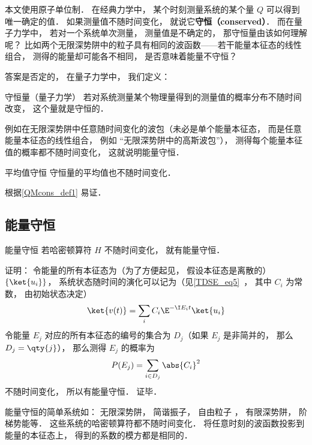 

本文使用原子单位制． 在经典力学中， 某个时刻测量系统的某个量 $Q$ 可以得到唯一确定的值． 如果测量值不随时间变化， 就说它\textbf{守恒（conserved）}． 而在量子力学中， 若对一个系统单次测量， 测量值是不确定的， 那守恒量由该如何理解呢？ 比如两个无限深势阱中的粒子具有相同的波函数——若干能量本征态的线性组合， 测得的能量却可能各不相同， 是否意味着能量不守恒？

答案是否定的， 在量子力学中， 我们定义：
\begin{definition}{守恒量（量子力学）}\label{QMcons_def1}
若对系统测量某个物理量得到的测量值的概率分布不随时间改变， 这个量就是守恒的．
\end{definition}

例如在无限深势阱中任意随时间变化的波包（未必是单个能量本征态， 而是任意能量本征态的线性组合， 例如 “无限深势阱中的高斯波包”）， 测得每个能量本征值的概率都不随时间变化， 这就说明能量守恒．

\begin{corollary}{平均值守恒}
守恒量的平均值也不随时间变化．
\end{corollary}
根据\autoref{QMcons_def1} 易证．

\subsection{能量守恒}

\begin{theorem}{能量守恒}
若哈密顿算符 $H$ 不随时间变化， 就有能量守恒．
\end{theorem}
证明： 令能量的所有本征态为（为了方便起见， 假设本征态是离散的） $\{\ket{u_i}\}$， 系统状态随时间的演化可以记为（见\autoref{TDSE_eq5}~， 其中 $C_i$ 为常数， 由初始状态决定）
\begin{equation}
\ket{v(t)} = \sum_i C_i \E^{-\I E_i t} \ket{u_i}
\end{equation}
令能量 $E_j$ 对应的所有本征态的编号的集合为 $D_j$（如果 $E_j$ 是非简并的， 那么 $D_j = \qty{j}$），%
那么测得 $E_j$ 的概率为
\begin{equation}
P(E_j) = \sum_{i \in D_j} \abs{C_i}^2
\end{equation}
不随时间变化， 所以有能量守恒． 证毕．

\begin{example}{}
能量守恒的简单系统如： 无限深势阱， 简谐振子， 自由粒子%
， 有限深势阱， 阶梯势能等． 这些系统的哈密顿算符都不随时间变化． 将任意时刻的波函数投影到能量的本征态上， 得到的系数的模方都是相同的．
\end{example}

